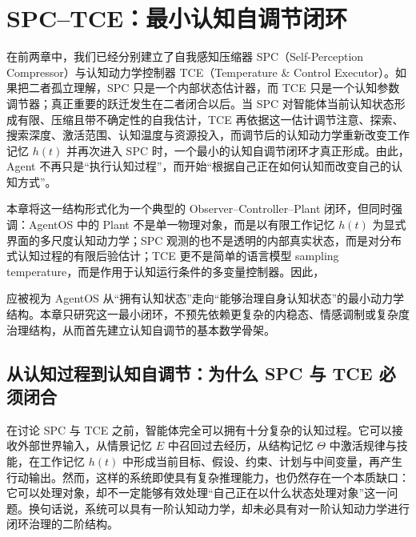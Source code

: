 \chapter{SPC--TCE：最小认知自调节闭环}
\label{chap:spc-tce-minimal-loop}

\begin{chapterlead}
在前两章中，我们已经分别建立了自我感知压缩器 SPC（Self-Perception Compressor）与认知动力学控制器 TCE（Temperature \& Control Executor）。如果把二者孤立理解，SPC 只是一个内部状态估计器，而 TCE 只是一个认知参数调节器；真正重要的跃迁发生在二者闭合以后。当 SPC 对智能体当前认知状态形成有限、压缩且带不确定性的自我估计，TCE 再依据这一估计调节注意、探索、搜索深度、激活范围、认知温度与资源投入，而调节后的认知动力学重新改变工作记忆 $h(t)$ 并再次进入 SPC 时，一个最小的认知自调节闭环才真正形成。由此，Agent 不再只是``执行认知过程''，而开始``根据自己正在如何认知而改变自己的认知方式''。

本章将这一结构形式化为一个典型的 Observer--Controller--Plant 闭环，但同时强调：AgentOS 中的 Plant 不是单一物理对象，而是以有限工作记忆 $h(t)$ 为显式界面的多尺度认知动力学；SPC 观测的也不是透明的内部真实状态，而是对分布式认知过程的有限后验估计；TCE 更不是简单的语言模型 sampling temperature，而是作用于认知运行条件的多变量控制器。因此，
\begin{statementbox}
\centering
{}
\end{statementbox}
应被视为 AgentOS 从``拥有认知状态''走向``能够治理自身认知状态''的最小动力学结构。本章只研究这一最小闭环，不预先依赖更复杂的内稳态、情感调制或复杂度治理结构，从而首先建立认知自调节的基本数学骨架。
\end{chapterlead}

\section{从认知过程到认知自调节：为什么 SPC 与 TCE 必须闭合}

在讨论 SPC 与 TCE 之前，智能体完全可以拥有十分复杂的认知过程。它可以接收外部世界输入，从情景记忆 $E$ 中召回过去经历，从结构记忆 $\Theta$ 中激活规律与技能，在工作记忆 $h(t)$ 中形成当前目标、假设、约束、计划与中间变量，再产生行动输出。然而，这样的系统即使具有复杂推理能力，也仍然存在一个本质缺口：它可以处理对象，却不一定能够有效处理``自己正在以什么状态处理对象''这一问题。换句话说，系统可以具有一阶认知动力学，却未必具有对一阶认知动力学进行闭环治理的二阶结构。

